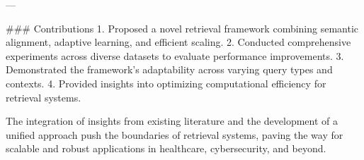 ---

### Contributions
1. Proposed a novel retrieval framework combining semantic alignment, adaptive learning, and efficient scaling.
2. Conducted comprehensive experiments across diverse datasets to evaluate performance improvements.
3. Demonstrated the framework’s adaptability across varying query types and contexts.
4. Provided insights into optimizing computational efficiency for retrieval systems.

The integration of insights from existing literature and the development of a unified approach push the boundaries of retrieval systems, paving the way for scalable and robust applications in healthcare, cybersecurity, and beyond.
